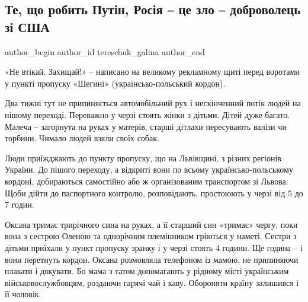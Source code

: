  
 
 
 
 
 
\subsection{Те, що робить Путін, Росія ‒ це зло ‒ доброволець зі США}
\label{sec:09_03_2022.stz.news.ua.radiosvoboda.1.rosia_ce_zlo}
 
\ifcmt
 author_begin
   author_id tereschuk_galina
 author_end
\fi

«Не втікай. Захищай!» – написано на великому рекламному щиті перед воротами у
пункті пропуску «Шегині» (українсько-польський кордон).


Два тижні тут не припиняється автомобільний рух і нескінченний потік людей на
пішому переході. Переважно у черзі стоять жінки з дітьми. Дітей дуже багато.
Малеча ‒ загорнута на руках у матерів, старші дітлахи пересувають валізи чи
торбини. Чимало людей взяли своїх собак.

Люди приїжджають до пункту пропуску, що на Львівщині, з різних регіонів
України. До пішого переходу, а відкриті вони по всьому українсько-польському
кордоні, добираються самостійно або ж організованим транспортом зі Львова. Щоби
дійти до паспортного контролю, розповідають, простоюють у черзі від 5 до 7
годин.


Оксана тримає трирічного сина на руках, а її старший син «тримає» чергу, поки
вона з сестрою Оленою та однорічним племінником гріються у наметі. Сестри з
дітьми приїхали у пункт пропуску зранку і у черзі стоять 4 години. Ще година –
і вони перетнуть кордон. Оксана розмовляла телефоном із мамою, не припиняючи
плакати і дякувати. Бо мама з татом допомагають у рідному місті українським
військовослужбовцям, роздаючи гарячі чай і каву. Обороняти країну залишився і
її чоловік.

